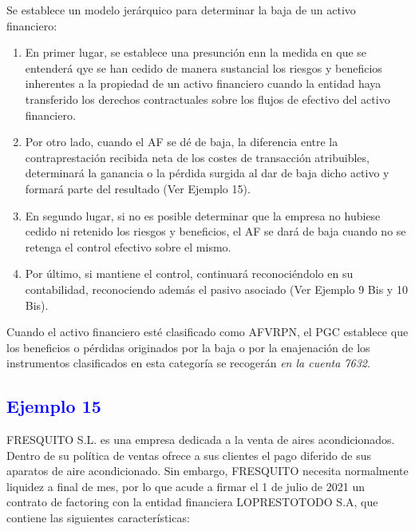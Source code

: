Se establece un modelo jerárquico para determinar la baja de un activo financiero:
\begin{enumerate}
    \item En primer lugar, se establece una presunción enn la medida en que se entenderá qye se han cedido de manera sustancial los riesgos y beneficios inherentes a la propiedad de un activo financiero cuando la entidad haya transferido los derechos contractuales sobre los flujos de efectivo del activo financiero.
    \item Por otro lado, cuando el AF se dé de baja, la diferencia entre la contraprestación recibida neta de los costes de transacción atribuibles, determinará la ganancia o la pérdida surgida al dar de baja dicho activo y formará parte del resultado (Ver Ejemplo 15).
    \item En segundo lugar, si no es posible determinar que la empresa no hubiese cedido ni retenido los riesgos y beneficios, el AF se dará de baja cuando no se retenga el control efectivo sobre el mismo.
    \item Por último, si mantiene el control, continuará reconociéndolo en su contabilidad, reconociendo además el pasivo asociado (Ver Ejemplo 9 Bis y 10 Bis). 
\end{enumerate}

Cuando el activo financiero esté clasificado como AFVRPN, el PGC establece que los beneficios o pérdidas originados por la baja o por la enajenación de los instrumentos clasificados en esta categoría se recogerán \textit{en la cuenta 7632}.

\subsection*{\textcolor{blue}{Ejemplo 15}}

FRESQUITO S.L. es una empresa dedicada a la venta de aires acondicionados. Dentro de su política de ventas ofrece a sus clientes el pago diferido de sus aparatos de aire acondicionado. Sin embargo, FRESQUITO necesita normalmente liquidez a final de mes, por lo que acude a firmar el 1 de julio de 2021 un contrato de factoring con la entidad financiera LOPRESTOTODO S.A, que contiene las siguientes características:

